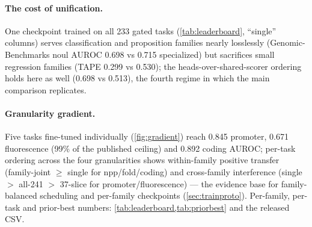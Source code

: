 \paragraph{The cost of unification.}
One checkpoint trained on all 233 gated tasks (\cref{tab:leaderboard}, ``single'' columns)
serves classification and proposition families nearly losslessly (Genomic-Benchmarks noul
AUROC 0.698 vs 0.715 specialized) but sacrifices small regression families (TAPE 0.299 vs
0.530); the heads-over-shared-scorer ordering holds here as well (0.698 vs 0.513), the
fourth regime in which the main comparison replicates.

\paragraph{Granularity gradient.}
Five tasks fine-tuned individually (\cref{fig:gradient}) reach 0.845 promoter, 0.671
fluorescence (99\% of the published ceiling) and 0.892 coding AUROC; per-task ordering
across the four granularities shows within-family positive transfer (family-joint $\ge$
single for npp/fold/coding) and cross-family interference (single $>$ all-241 $>$ 37-slice
for promoter/fluorescence) --- the evidence base for family-balanced scheduling and
per-family checkpoints (\cref{sec:trainproto}). Per-family, per-task and prior-best
numbers: \cref{tab:leaderboard,tab:priorbest} and the released CSV.
